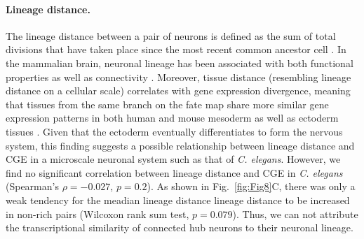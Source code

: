 \documentclass[10pt,letterpaper]{article}
\begin{document}
{\paragraph{Lineage distance.}
The lineage distance between a pair of neurons is defined as the sum of total divisions that have taken place since the most recent common ancestor cell \cite{Pavlovic:2014gx, Sulston1977, Sulston1983}.
In the mammalian brain, neuronal lineage has been associated with both functional properties \cite{Ciceri2013, Li2012} as well as connectivity \cite{Yu2012}.
Moreover, tissue distance (resembling lineage distance on a cellular scale) correlates with gene expression divergence, meaning that tissues from the same branch on the fate map share more similar gene expression patterns in both human and mouse mesoderm as well as ectoderm tissues \cite{Cui2007}.
Given that the ectoderm eventually differentiates to form the nervous system, this finding suggests a possible relationship between lineage distance and CGE in a microscale neuronal system such as that of \textit{C. elegans}.
However, we find no significant correlation between lineage distance and CGE in \textit{C. elegans} (Spearman's $\rho = -0.027$, $p = 0.2$).
As shown in Fig.~\ref{fig:Fig8}C, there was only a weak tendency for the meadian lineage distance lineage distance to be increased in non-rich pairs (Wilcoxon rank sum test, $p = 0.079$).
Thus, we can not attribute the transcriptional similarity of connected hub neurons to their neuronal lineage.


}
\end{document}
